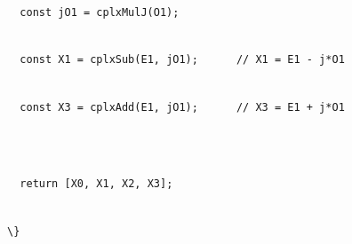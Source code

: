\documentclass[
]{article}
\newcommand{\passthrough}[1]{#1}
\begin{document}
\passthrough{\lstinline!  !}\passthrough{\lstinline!const!}\passthrough{\lstinline! !}\passthrough{\lstinline!jO!}\passthrough{\lstinline!1!}\passthrough{\lstinline! !}\passthrough{\lstinline!=!}\passthrough{\lstinline! !}\passthrough{\lstinline!cplxMulJ!}\passthrough{\lstinline!(!}\passthrough{\lstinline!O!}\passthrough{\lstinline!1);!}\strut \\
\passthrough{\lstinline!  !}\passthrough{\lstinline!const!}\passthrough{\lstinline! !}\passthrough{\lstinline!X!}\passthrough{\lstinline!1!}\passthrough{\lstinline! !}\passthrough{\lstinline!=!}\passthrough{\lstinline! !}\passthrough{\lstinline!cplxSub!}\passthrough{\lstinline!(!}\passthrough{\lstinline!E!}\passthrough{\lstinline!1,!}\passthrough{\lstinline! !}\passthrough{\lstinline!jO!}\passthrough{\lstinline!1);!}\passthrough{\lstinline!      !}\passthrough{\lstinline!//!}\passthrough{\lstinline! !}\passthrough{\lstinline!X!}\passthrough{\lstinline!1!}\passthrough{\lstinline! !}\passthrough{\lstinline!=!}\passthrough{\lstinline! !}\passthrough{\lstinline!E!}\passthrough{\lstinline!1!}\passthrough{\lstinline! !}\passthrough{\lstinline!-!}\passthrough{\lstinline! !}\passthrough{\lstinline!j!}\passthrough{\lstinline!*!}\passthrough{\lstinline!O!}\passthrough{\lstinline!1!}\strut \\
\passthrough{\lstinline!  !}\passthrough{\lstinline!const!}\passthrough{\lstinline! !}\passthrough{\lstinline!X!}\passthrough{\lstinline!3!}\passthrough{\lstinline! !}\passthrough{\lstinline!=!}\passthrough{\lstinline! !}\passthrough{\lstinline!cplxAdd!}\passthrough{\lstinline!(!}\passthrough{\lstinline!E!}\passthrough{\lstinline!1,!}\passthrough{\lstinline! !}\passthrough{\lstinline!jO!}\passthrough{\lstinline!1);!}\passthrough{\lstinline!      !}\passthrough{\lstinline!//!}\passthrough{\lstinline! !}\passthrough{\lstinline!X!}\passthrough{\lstinline!3!}\passthrough{\lstinline! !}\passthrough{\lstinline!=!}\passthrough{\lstinline! !}\passthrough{\lstinline!E!}\passthrough{\lstinline!1!}\passthrough{\lstinline! !}\passthrough{\lstinline!+!}\passthrough{\lstinline! !}\passthrough{\lstinline!j!}\passthrough{\lstinline!*!}\passthrough{\lstinline!O!}\passthrough{\lstinline!1!}\strut \\
\strut \\
\passthrough{\lstinline!  !}\passthrough{\lstinline!return!}\passthrough{\lstinline! !}\passthrough{\lstinline![!}\passthrough{\lstinline!X!}\passthrough{\lstinline!0,!}\passthrough{\lstinline! !}\passthrough{\lstinline!X!}\passthrough{\lstinline!1,!}\passthrough{\lstinline! !}\passthrough{\lstinline!X!}\passthrough{\lstinline!2,!}\passthrough{\lstinline! !}\passthrough{\lstinline!X!}\passthrough{\lstinline!3];!}\strut \\
\passthrough{\lstinline!\}!}
\end{document}
